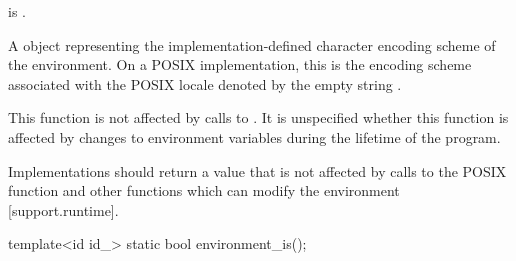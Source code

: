 \documentclass{wg21}
\begin{document}
\begin{addedblock}
\begin{itemdescr}
\mandates {} is .

\returns A  object representing the implementation-defined character encoding scheme of the environment.
On a POSIX implementation, this is the encoding scheme associated with the POSIX locale denoted by the empty string .

\begin{note}
    This function is not affected by calls to .
    It is unspecified whether this function is affected by changes to environment variables during the lifetime of the program.
\end{note}

\recommended Implementations should return a value that is not affected by calls to the POSIX function 
and other functions which can modify the environment [support.runtime].

%
%
%
%
%
%
%
%

\end{itemdescr}

\begin{itemdecl}
template<id id_>
static bool environment_is();
\end{itemdecl}

\begin{itemdescr}
\returns {}
\end{itemdescr}


\end{addedblock}
\end{document}
